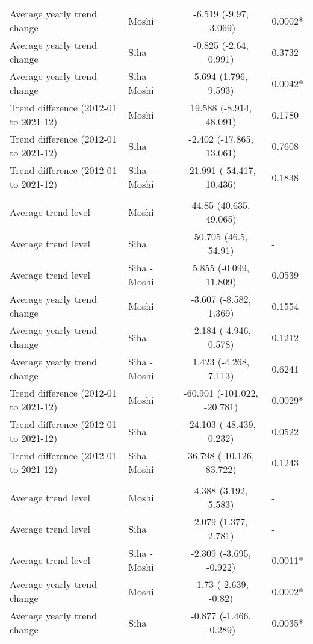 \begin{longtable}{l|lcl}
Average yearly trend change & Moshi & -6.519 (-9.97, -3.069) & 0.0002* \\ 
Average yearly trend change & Siha & -0.825 (-2.64, 0.991) & 0.3732 \\ 
Average yearly trend change & Siha - Moshi & 5.694 (1.796, 9.593) & 0.0042* \\ 
Trend difference (2012-01 to 2021-12) & Moshi & 19.588 (-8.914, 48.091) & 0.1780 \\ 
Trend difference (2012-01 to 2021-12) & Siha & -2.402 (-17.865, 13.061) & 0.7608 \\ 
Trend difference (2012-01 to 2021-12) & Siha - Moshi & -21.991 (-54.417, 10.436) & 0.1838 \\ 
\midrule\addlinespace[2.5pt]
\multicolumn{4}{l}{Road Traffic Accidents} \\[2.5pt] 
\midrule\addlinespace[2.5pt]
Average trend level & Moshi & 44.85 (40.635, 49.065) & - \\ 
Average trend level & Siha & 50.705 (46.5, 54.91) & - \\ 
Average trend level & Siha - Moshi & 5.855 (-0.099, 11.809) & 0.0539 \\ 
Average yearly trend change & Moshi & -3.607 (-8.582, 1.369) & 0.1554 \\ 
Average yearly trend change & Siha & -2.184 (-4.946, 0.578) & 0.1212 \\ 
Average yearly trend change & Siha - Moshi & 1.423 (-4.268, 7.113) & 0.6241 \\ 
Trend difference (2012-01 to 2021-12) & Moshi & -60.901 (-101.022, -20.781) & 0.0029* \\ 
Trend difference (2012-01 to 2021-12) & Siha & -24.103 (-48.439, 0.232) & 0.0522 \\ 
Trend difference (2012-01 to 2021-12) & Siha - Moshi & 36.798 (-10.126, 83.722) & 0.1243 \\ 
\midrule\addlinespace[2.5pt]
\multicolumn{4}{l}{Schistosomiasis} \\[2.5pt] 
\midrule\addlinespace[2.5pt]
Average trend level & Moshi & 4.388 (3.192, 5.583) & - \\ 
Average trend level & Siha & 2.079 (1.377, 2.781) & - \\ 
Average trend level & Siha - Moshi & -2.309 (-3.695, -0.922) & 0.0011* \\ 
Average yearly trend change & Moshi & -1.73 (-2.639, -0.82) & 0.0002* \\ 
Average yearly trend change & Siha & -0.877 (-1.466, -0.289) & 0.0035* \\ 

\end{longtable}
